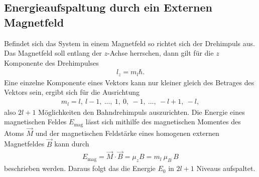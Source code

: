 \subsection{Energieaufspaltung durch ein Externen Magnetfeld}
Befindet sich das System in einem Magnetfeld so richtet sich der Drehimpuls aus.
Das Magnetfeld soll entlang der $z$-Achse herrschen, dann gilt für die $z$ Komponente des Drehimpulses
\begin{align}
	l_z=m_l\hbar.
\end{align}
Eine einzelne Komponente eines Vektors kann nur kleiner gleich des Betrages des Vektors sein, ergibt sich für die Ausrichtung
\begin{align}
	m_l = l,\ l-1,\ ...,\ 1,\ 0,\ -1,\ ... ,\ -l+1,\ -l,
\end{align}
also $2l+1 $ Möglichkeiten den Bahndrehimpuls auszurichten.
Die Energie eines magnetischen Feldes $E_\text{mag}$ lässt sich mithilfe des magnetischen Momentes des Atoms $\vec{M}$ und der magnetischen Feldstärke eines homogenen externen Magnetfeldes $\vec{B}$ kann durch 
\begin{align}
	E_\text{mag}=\vec{M}\cdot\vec{B}=\mu_zB=m_l\ \mu_B\ B\label{eq:Emag}
\end{align}
beschrieben werden. 
Daraus folgt das die Energie $E_0$ in $2l+1$ Niveaus aufspaltet.
